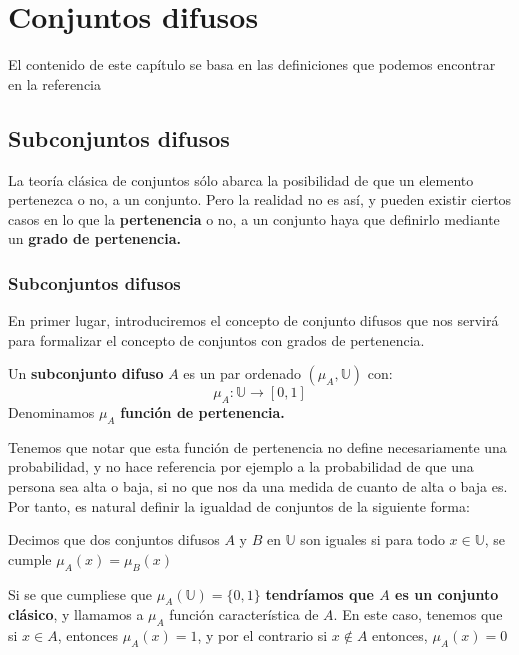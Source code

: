\chapter{Conjuntos difusos}
El contenido de este capítulo se basa en las definiciones que podemos encontrar en la referencia \cite{fuzzyintro}

\section{Subconjuntos difusos}
La teoría clásica de conjuntos sólo abarca la posibilidad de que un elemento pertenezca o no, a un conjunto. Pero la realidad no es así, y pueden existir ciertos casos en lo que la \textbf{pertenencia} o no, a un conjunto haya que definirlo mediante un \textbf{grado de pertenencia.}

\subsection{Subconjuntos difusos}
En primer lugar, introduciremos el concepto de conjunto difusos que nos servirá para formalizar el concepto de conjuntos con grados de pertenencia.

\begin{definicion}
	\label{def:subconjunto_difuso}
	Un \textbf{subconjunto difuso} $A$ es un par ordenado $(\mu_A, \mathbb{U})$ con:
	\[
		\mu_A : \mathbb{U} \longrightarrow [0,1]
	\]
	Denominamos $\mu_A$ \textbf{función de pertenencia.}
\end{definicion}
Tenemos que notar que esta función de pertenencia no define necesariamente una probabilidad, y no hace referencia por ejemplo a la probabilidad de que una persona sea alta o baja, si no que nos da una medida de cuanto de alta o baja es.\\

Por tanto, es natural definir la igualdad de conjuntos de la siguiente forma:

\begin{definicion}
	\label{def:igualdad}
	Decimos que dos conjuntos difusos $A$ y $B$ en $\mathbb{U}$ son iguales si para todo $x \in \mathbb{U}$, se cumple $\mu_A(x) = \mu_B(x)$
\end{definicion}

Si se que cumpliese que $\mu_A(\mathbb{U})=\{0, 1\}$ \textbf{tendríamos que $A$ es un conjunto clásico}, y llamamos a $\mu_A$ función característica de $A$. En este caso, tenemos que si $x \in A$, entonces $\mu_A(x)=1$, y por el contrario si $x \notin A$ entonces, $\mu_A(x)=0$

